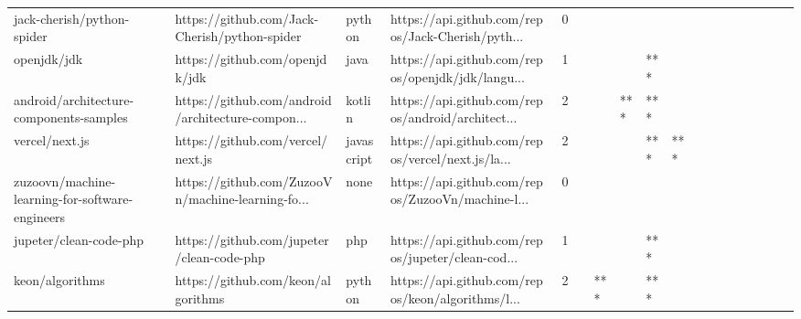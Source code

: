\begin{tabular}{llllrlllllllllllll}
jack-cherish/python-spider                         &      https://github.com/Jack-Cherish/python-spider &            python &  https://api.github.com/repos/Jack-Cherish/pyth... &       0 &         &        &           &                &                 &        &           &           &          &          &       &              &          \\
openjdk/jdk                                        &                     https://github.com/openjdk/jdk &              java &  https://api.github.com/repos/openjdk/jdk/langu... &       1 &         &        &           &            *** &                 &        &           &           &          &          &       &              &          \\
android/architecture-components-samples            &  https://github.com/android/architecture-compon... &            kotlin &  https://api.github.com/repos/android/architect... &       2 &         &        &       *** &            *** &                 &        &           &           &          &          &       &              &          \\
vercel/next.js                                     &                  https://github.com/vercel/next.js &        javascript &  https://api.github.com/repos/vercel/next.js/la... &       2 &         &        &           &            *** &             *** &        &           &           &          &          &       &              &          \\
zuzoovn/machine-learning-for-software-engineers    &  https://github.com/ZuzooVn/machine-learning-fo... &              none &  https://api.github.com/repos/ZuzooVn/machine-l... &       0 &         &        &           &                &                 &        &           &           &          &          &       &              &          \\
jupeter/clean-code-php                             &          https://github.com/jupeter/clean-code-php &               php &  https://api.github.com/repos/jupeter/clean-cod... &       1 &         &        &           &            *** &                 &        &           &           &          &          &       &              &          \\
keon/algorithms                                    &                 https://github.com/keon/algorithms &            python &  https://api.github.com/repos/keon/algorithms/l... &       2 &         &    *** &           &            *** &                 &        &           &           &          &          &       &              &          \\

\end{tabular}
